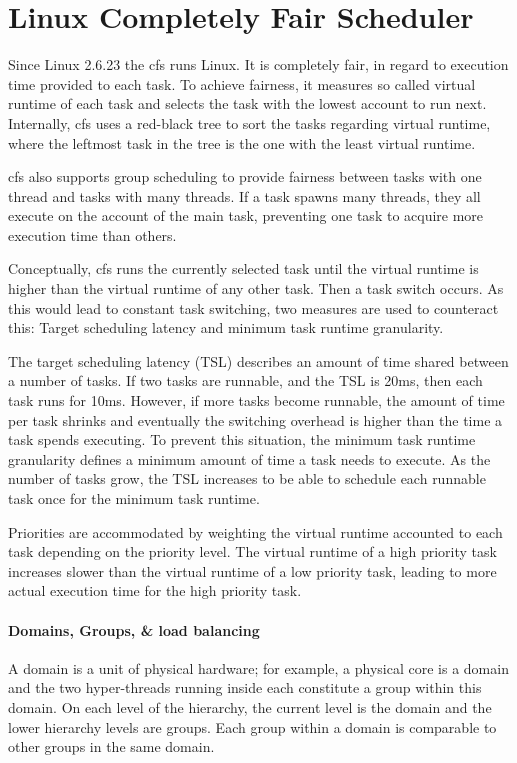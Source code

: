 \section{Linux Completely Fair Scheduler}
\label{state:cfs}


Since Linux 2.6.23 the \gls{cfs} runs Linux.
It is completely fair, in regard to execution time provided to each task.
To achieve fairness, it measures so called virtual runtime of each task and
selects the task with the lowest account to run next.
Internally, \gls{cfs} uses a red-black tree to sort the tasks regarding virtual
runtime, where the leftmost task in the tree is the one with the least virtual
runtime.

\gls{cfs} also supports group scheduling to provide fairness between tasks with one
thread and tasks with many threads.
If a task spawns many threads, they all execute on the account of the main
task, preventing one task to acquire more execution time than others.

Conceptually, \gls{cfs} runs the currently selected task until the virtual runtime is
higher than the virtual runtime of any other task.
Then a task switch occurs.
As this would lead to constant task switching, two measures are used to
counteract this: Target scheduling latency and minimum task runtime granularity.

The target scheduling latency (TSL) describes an amount of time shared between a
number of tasks.
If two tasks are runnable, and the TSL is 20ms, then each task runs for 10ms.
However, if more tasks become runnable, the amount of time per task shrinks and
eventually the switching overhead is higher than the time a task spends
executing.
To prevent this situation, the minimum task runtime granularity defines a
minimum amount of time a task needs to execute.
As the number of tasks grow, the TSL increases to be able to schedule each
runnable task once for the minimum task runtime.

Priorities are accommodated by weighting the virtual runtime accounted to each
task depending on the priority level.
The virtual runtime of a high priority task increases slower than the virtual
runtime of a low priority task, leading to more actual execution time for the
high priority task.

\paragraph{Domains, Groups, \& load balancing}
A domain is a unit of physical hardware;
for example, a physical core is a domain and the two hyper-threads running
inside each constitute a group within this domain.
On each level of the hierarchy, the current level is the domain and the lower
hierarchy levels are groups.
Each group within a domain is comparable to other groups in the same domain.

